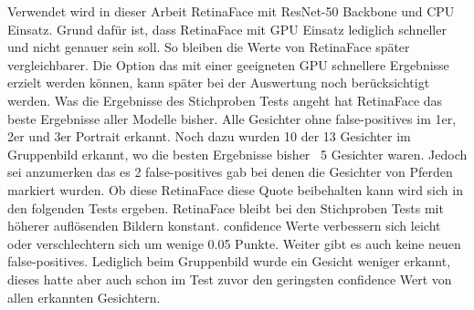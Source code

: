Verwendet wird in dieser Arbeit RetinaFace mit ResNet-50 Backbone und CPU Einsatz. Grund dafür ist, dass RetinaFace mit GPU Einsatz lediglich schneller und nicht genauer sein soll. So bleiben die Werte von RetinaFace später vergleichbarer. Die Option das mit einer geeigneten GPU schnellere Ergebnisse erzielt werden können, kann später bei der Auswertung noch berücksichtigt werden. Was die Ergebnisse des Stichproben Tests angeht hat RetinaFace das beste Ergebnisse aller Modelle bisher. Alle Gesichter ohne false-positives im 1er, 2er und 3er Portrait erkannt. Noch dazu wurden 10 der 13 Gesichter im Gruppenbild erkannt, wo die besten Ergebnisse bisher ~5 Gesichter waren. Jedoch sei anzumerken das es 2 false-positives gab bei denen die Gesichter von Pferden markiert wurden. Ob diese RetinaFace diese Quote beibehalten kann wird sich in den folgenden Tests ergeben. RetinaFace bleibt bei den Stichproben Tests mit höherer auflösenden Bildern konstant. confidence Werte verbessern sich leicht oder verschlechtern sich um wenige 0.05 Punkte. Weiter gibt es auch keine neuen false-positives. Lediglich beim Gruppenbild wurde ein Gesicht weniger erkannt, dieses hatte aber auch schon im Test zuvor den geringsten confidence Wert von allen erkannten Gesichtern.

